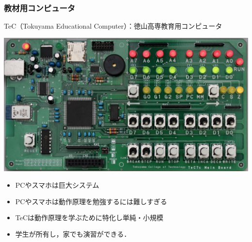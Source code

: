 \documentclass{beamer}                 %
\begin{document}
\begin{frame}
  \frametitle{教材用コンピュータ}
  TeC（Tokuyama Educational Computer）：徳山高専教育用コンピュータ

  \centerline{\includegraphics[scale=0.2]{../Img/TeC7c.jpg}}
  \begin{itemize}
  \item PCやスマホは巨大システム
  \item PCやスマホは動作原理を勉強するには難しすぎる
  \item TeCは動作原理を学ぶために特化し単純・小規模
  \item 学生が所有し，家でも演習ができる．
  \end{itemize}
  \vfill
\end{frame}
\end{document}
